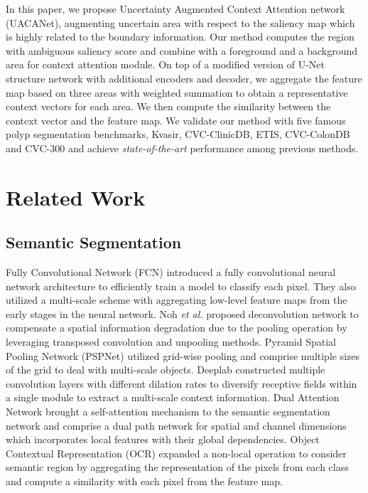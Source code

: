 \documentclass[sigconf]{acmart}
\begin{document}
In this paper, we propose Uncertainty Augmented Context Attention network (UACANet), augmenting uncertain area with respect to the saliency map which is highly related to the boundary information. Our method computes the region with ambiguous saliency score and combine with a foreground and a background area for context attention module. On top of a modified version of U-Net \cite{ronneberger2015u} structure network with additional encoders and decoder, we aggregate the feature map based on three areas with weighted summation to obtain a representative context vectors for each area. We then compute the similarity between the context vector and the feature map. We validate our method with five famous polyp segmentation benchmarks, Kvasir, CVC-ClinicDB, ETIS, CVC-ColonDB and CVC-300 and achieve \textit{state-of-the-art} performance among previous methods. 

\section{Related Work}

\subsection{Semantic Segmentation}

Fully Convolutional Network (FCN) \cite{long2015fully} introduced a fully convolutional neural network architecture to efficiently train a model to classify each pixel. They also utilized a multi-scale scheme with aggregating low-level feature maps from the early stages in the neural network. Noh \textit{et al.} proposed deconvolution network \cite{noh2015learning} to compensate a spatial information degradation due to the pooling operation by leveraging transposed convolution and unpooling methods. Pyramid Spatial Pooling Network (PSPNet) utilized grid-wise pooling and comprise multiple sizes of the grid to deal with multi-scale objects. Deeplab \cite{chen2017rethinking} constructed multiple convolution layers with different dilation rates to diversify receptive fields within a single module to extract a multi-scale context information. Dual Attention Network \cite{fu2019dual} brought a self-attention mechanism to the semantic segmentation network and comprise a dual path network for spatial and channel dimensions which incorporates local features with their global dependencies. Object Contextual Representation (OCR) \cite{yuan2019object} expanded a non-local operation to consider semantic region by aggregating the representation of the pixels from each class and compute a similarity with each pixel from the feature map. 
\end{document}
